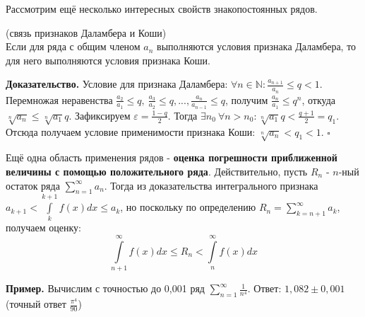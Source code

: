 Рассмотрим ещё несколько интересных свойств знакопостоянных рядов. 
\begin{theor}
    (связь признаков Даламбера и Коши)\\
    Если для ряда с общим членом $a_n$ выполняются условия признака Даламбера,
    то для него выполняются условия признака Коши. 
\end{theor}
\textbf{Доказательство.} Условие для признака Даламбера: 
$\forall n\in\mathbb{N}:\frac{a_{n+1}}{a_n}\leqslant q<1$. Перемножая 
неравенства $\frac{a_2}{a_1}\leqslant q,~\frac{a_3}{a_2}\leqslant q,...
,\frac{a_n}{a_{n-1}}\leqslant q$, получим $\frac{a_n}{a_1}\leqslant q^n$, 
откуда $\sqrt[n]{a_n}\leqslant\sqrt[n]{a_1}q$. Зафиксируем 
$\varepsilon=\frac{1-q}{2}$. Тогда $\exists n_0~\forall n>n_0:\sqrt[n]{a_1}q<
\frac{q+1}{2}=q_1$. Отсюда получаем условие применимости признака Коши:
$\sqrt[n]{a_n}<q_1<1$. $\square$ 

Ещё одна область применения рядов - \textbf{оценка погрешности приближенной 
величины с помощью положительного ряда}. Действительно, пусть 
$R_n$ -  $n$-ный остаток ряда  $\sum\limits_{n=1}^{\infty} a_n$. Тогда
из доказательства интегрального признака $a_{k+1}<\int\limits_{k}^{k+1}f(x)dx
\leqslant a_k$, но поскольку по определению $R_n=\sum\limits_{k=n+1}^{\infty}
a_k$, получаем оценку:
$$\int\limits_{n+1}^{\infty}f(x)dx\leqslant R_n<
\int\limits_{n}^{\infty}f(x)dx$$ 

\textbf{Пример.} Вычислим с точностью до 0,001 ряд 
$\sum\limits_{n=1}^{\infty} \frac{1}{n^4}$. Ответ: $1,082\pm0,001$
(точный ответ $\frac{\pi^4}{90}$)












